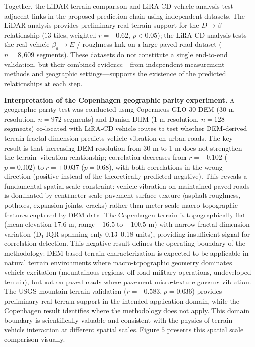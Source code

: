 \documentclass[11pt]{article}
\begin{document}
Together, the LiDAR terrain comparison and LiRA-CD vehicle analysis test adjacent links in the proposed prediction chain using independent datasets. The LiDAR analysis provides preliminary real-terrain support for the $D \rightarrow \beta$ relationship (13 tiles, weighted $r = -0.62$, $p < 0.05$); the LiRA-CD analysis tests the real-vehicle $\beta_a \rightarrow E$ / roughness link on a large paved-road dataset ($n = 8{,}609$ segments). These datasets do not constitute a single end-to-end validation, but their combined evidence---from independent measurement methods and geographic settings---supports the existence of the predicted relationships at each step.

\textbf{Interpretation of the Copenhagen geographic parity experiment.} A geographic parity test was conducted using Copernicus GLO-30 DEM (30 m resolution, $n=972$ segments) and Danish DHM (1 m resolution, $n=128$ segments) co-located with LiRA-CD vehicle routes to test whether DEM-derived terrain fractal dimension predicts vehicle vibration on urban roads. The key result is that increasing DEM resolution from 30 m to 1 m does not strengthen the terrain--vibration relationship; correlation decreases from $r = +0.102$ ($p = 0.002$) to $r = +0.037$ ($p = 0.68$), with both correlations in the wrong direction (positive instead of the theoretically predicted negative). This reveals a fundamental spatial scale constraint: vehicle vibration on maintained paved roads is dominated by centimeter-scale pavement surface texture (asphalt roughness, potholes, expansion joints, cracks) rather than meter-scale macro-topographic features captured by DEM data. The Copenhagen terrain is topographically flat (mean elevation 17.6 m, range $-16.5$ to $+100.5$ m) with narrow fractal dimension variation (D$_1$ IQR spanning only 0.13--0.18 units), providing insufficient signal for correlation detection. This negative result defines the operating boundary of the methodology: DEM-based terrain characterization is expected to be applicable in natural terrain environments where macro-topographic geometry dominates vehicle excitation (mountainous regions, off-road military operations, undeveloped terrain), but not on paved roads where pavement micro-texture governs vibration. The USGS mountain terrain validation ($r = -0.583$, $p = 0.036$) provides preliminary real-terrain support in the intended application domain, while the Copenhagen result identifies where the methodology does not apply. This domain boundary is scientifically valuable and consistent with the physics of terrain-vehicle interaction at different spatial scales. Figure 6 presents this spatial scale comparison visually.
\end{document}
